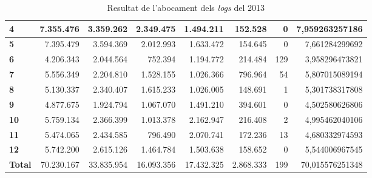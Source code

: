 \begin{table}[h!]
\begin{adjustbox}{width=1.5\textwidth, center}
\begin{tabular}{|l|r|r|r|r|r|r|r|}
            \textbf{4}     & 7.355.476  & 3.359.262  & 2.349.475  & 1.494.211  & 152.528   & 0   & 7,959263257186  \\
            \midrule
            \textbf{5}     & 7.395.479  & 3.594.369  & 2.012.993  & 1.633.472  & 154.645   & 0   & 7,661284299692  \\
            \textbf{6}     & 4.206.343  & 2.044.564  & 752.394    & 1.194.772  & 214.484   & 129 & 3,958296473821  \\
            \textbf{7}     & 5.556.349  & 2.204.810  & 1.528.155  & 1.026.366  & 796.964   & 54  & 5,807015089194  \\
            \textbf{8}     & 5.130.337  & 2.340.407  & 1.615.233  & 1.026.005  & 148.691   & 1   & 5,301738317808  \\
            \midrule
            \textbf{9}     & 4.877.675  & 1.924.794  & 1.067.070  & 1.491.210  & 394.601   & 0   & 4,502580626806  \\
            \textbf{10}    & 5.759.134  & 2.366.399  & 1.013.378  & 2.162.947  & 216.408   & 2   & 4,995462040106  \\
            \textbf{11}    & 5.474.065  & 2.434.585  & 796.490    & 2.070.741  & 172.236   & 13  & 4,680332974593  \\
            \textbf{12}    & 5.742.200  & 2.615.126  & 1.464.784  & 1.503.638  & 158.652   & 0   & 5,544006967545  \\
            \midrule
            \textbf{Total} & 70.230.167 & 33.835.954 & 16.093.356 & 17.432.325 & 2.868.333 & 199 & 70,015576251348 \\
            \bottomrule
        \end{tabular}
    \end{adjustbox}
    \caption{Resultat de l'abocament dels \textit{logs} del 2013}
    \label{tab:logs-table-2013}
\end{table}
